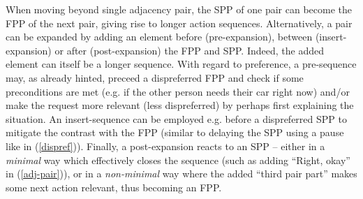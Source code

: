 \documentclass[11pt]{article}
\newcommand{\eref}[1]{(\autoref{#1})}
\begin{document}
{    %
    When moving beyond single adjacency pair, the SPP of one pair can become the FPP of the next pair, giving rise to longer action sequences. 
    Alternatively, a pair can be expanded by adding an element before (pre-expansion), between (insert-expansion) or after (post-expansion) the FPP and SPP. Indeed, the added element can itself be a longer sequence.
    With regard to preference, a pre-sequence may, as already hinted, preceed a dispreferred FPP and check if some preconditions are met (e.g. if the other person needs their car right now) and/or make the request more relevant (less dispreferred) by perhaps first explaining the situation.
    An insert-sequence can be employed e.g. before a dispreferred SPP to mitigate the contrast with the FPP (similar to delaying the SPP using a pause like in \eref{dispref}).
    Finally, a post-expansion reacts to an SPP -- either in a \textit{minimal} way which effectively closes the sequence (such as adding ``Right, okay'' in \eref{adj-pair}), or in a \textit{non-minimal} way where the added ``third pair part'' makes some next action relevant, thus becoming an FPP.
}
\end{document}

